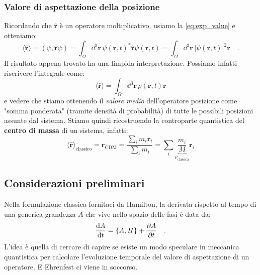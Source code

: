 \subsubsection{Valore di aspettazione della posizione}
Ricordando che $\hat{\bm{r}}$ è un operatore moltiplicativo, usiamo la \eqref{eq:exp_value} e otteniamo:
\[
    \langle \hat{\bm{r}} \rangle = (\psi, \hat{\bm{r}} \psi) = \int_\Omega \dd^3{\bm{r}}\,\psi(\bm{r},t)^* \hat{\bm{r}}\psi(\bm{r},t) = \int_\Omega \dd^3{\bm{r}}\, |\psi(\bm{r},t)|^2 {\bm{r}}\quad.
\]
Il risultato appena trovato ha una limpida interpretazione. Possiamo infatti riscrivere l'integrale come: 
\[
    \langle \hat{\bm{r}} \rangle = \int_\Omega \dd^3{\bm{r}}\, \rho(\bm{r},t) {\bm{r}}
\]
e vedere che stiamo ottenendo il \emph{valore medio} dell'operatore posizione come "somma ponderata" (tramite densità di probabilità) di tutte le possibili posizioni assunte dal sistema. Stiamo quindi ricostruendo la controparte quantistica del \textbf{centro di massa} di un sistema, infatti:
\[
    \langle \hat{\bm{r}} \rangle_{\text{classico}} = \bm{r}_{\text{CDM}} = \frac{\sum_i m_i \bm{r}_i}{\sum_i m_i} = \sum_i \underbrace{\frac{m_i}{M}}_{\rho_{\text{classica}}} \bm{r}_i 
\]

\subsection{Considerazioni preliminari}
Nella formulazione classica fornitaci da Hamilton, la derivata rispetto al tempo di una generica grandezza $A$ che vive nello spazio delle fasi è data da:
\[
    \dv{A}{t} = \{A,H\} + \pdv{A}{t} \quad.
\]
L'idea è quella di cercare di capire se esiste un modo speculare in meccanica quantistica per calcolare l'evoluzione temporale del valore di aspettazione di un operatore. E Ehrenfest ci viene in soccorso.


